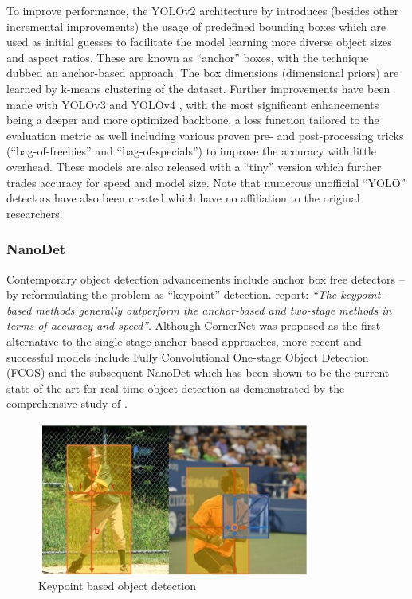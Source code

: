 \documentclass[a4paper,twoside,12pt]{report}
\begin{document}
To improve performance, the YOLOv2 architecture by \cite{yolov2} introduces (besides other incremental improvements) the usage of predefined bounding boxes which are used as initial guesses to facilitate the model learning more diverse object sizes and aspect ratios. These are known as ``anchor'' boxes, with the technique dubbed an anchor-based approach. The box dimensions (dimensional priors) are learned by k-means clustering of the dataset. Further improvements have been made with YOLOv3 \citep{yolov3} and YOLOv4 \citep{yolov4}, with the most significant enhancements being a deeper and more optimized backbone, a loss function tailored to the evaluation metric as well including various proven pre- and post-processing tricks (``bag-of-freebies'' and ``bag-of-specials'') to improve the accuracy with little overhead. These models are also released with a ``tiny'' version which further trades accuracy for speed and model size. Note that numerous unofficial ``YOLO'' detectors have also been created which have no affiliation to the original researchers.

\subsubsection{NanoDet}

Contemporary object detection advancements include anchor box free detectors -- by reformulating the problem as ``keypoint'' detection. \cite{comprehensive} report: \textit{``The keypoint-based methods generally outperform the anchor-based and two-stage methods in terms of accuracy and speed''}. Although CornerNet \citep{cornernet} was proposed as the first alternative to the single stage anchor-based approaches, more recent and successful models include Fully Convolutional One-stage Object Detection (FCOS) \citep{fcos} and the subsequent NanoDet \citep{nanodet} which has been shown to be the current state-of-the-art for real-time object detection as demonstrated by the comprehensive study of \cite{comprehensive}.

\begin{figure}[h!]
\begin{center}
\includegraphics[width=9cm]{images/keypointdetect.jpg}
\caption{Keypoint based object detection \citep{fcos}}
\label{fig:keypointdetect}
\end{center}
\end{figure}
\end{document}
